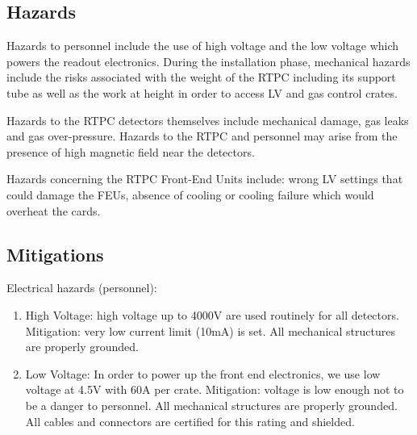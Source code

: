\subsection{Hazards} 

Hazards to personnel include the use of high voltage and the low voltage which powers the readout electronics. During the installation phase, mechanical hazards include the risks associated with the weight of the RTPC including its support tube as well as the work at height in order to access LV and gas control crates.

Hazards to the RTPC detectors themselves include mechanical damage, gas leaks and gas over-pressure. Hazards to the RTPC and personnel may arise from the presence of high magnetic field near the detectors.

Hazards concerning the RTPC Front-End Units include: wrong LV settings that could damage the FEUs, absence of cooling or cooling failure which would overheat the cards.

%
%

\subsection{Mitigations}

Electrical hazards (personnel):

\begin{enumerate}
\item High Voltage: high voltage up to 4000V are used routinely for all detectors. Mitigation: very low current limit (10mA) is set. All mechanical structures are properly grounded.
\item Low Voltage: In order to power up the front end electronics, we use low voltage at 4.5V with 60A per crate. Mitigation: voltage is low enough not to be a danger to personnel. All mechanical structures are properly grounded. All cables and connectors are certified for this rating and shielded.
\end{enumerate}

